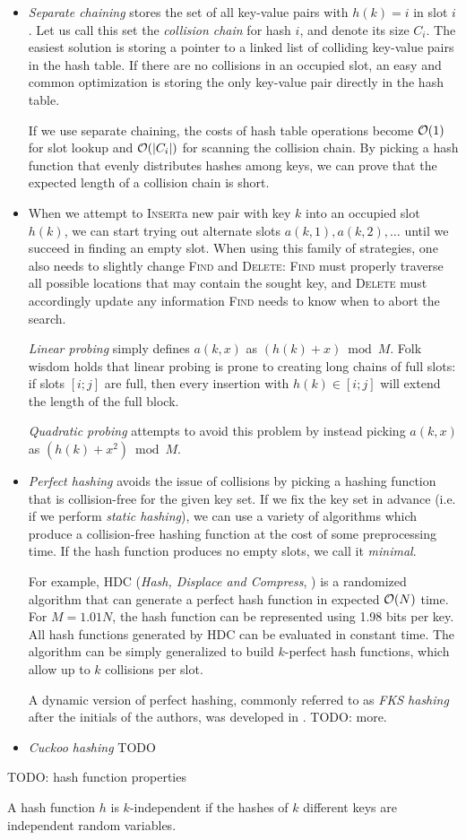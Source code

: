 \begin{itemize}
\item
\emph{Separate chaining} stores the set of all key-value pairs with
$h(k)=i$ in slot $i$. Let us call this set the \emph{collision chain} for hash
$i$, and denote its size $C_i$. The easiest solution is storing a pointer to
a linked list of colliding key-value pairs in the hash table. If there are no
collisions in an occupied slot, an easy and common optimization is storing
the only key-value pair directly in the hash table.

If we use separate chaining, the costs of hash table operations become $\mathcal{O}(1)$
for slot lookup and $\mathcal{O}(|C_i|)$ for scanning the collision chain. By picking
a hash function that evenly distributes hashes among keys, we can prove
that the expected length of a collision chain is short.

\item
When we attempt to \textsc{Insert}a new pair with key $k$ into an occupied slot
$h(k)$, we can start trying out alternate slots $a(k,1), a(k,2), \ldots$
until we succeed in finding an empty slot. When using this family of strategies,
one also needs to slightly change \textsc{Find} and \textsc{Delete}:
\textsc{Find} must properly traverse all possible locations that may contain
the sought key, and \textsc{Delete} must accordingly update any information
\textsc{Find} needs to know when to abort the search.

\emph{Linear probing} simply defines $a(k,x)$ as $(h(k)+x) \bmod M$.
Folk wisdom holds that linear probing is prone to creating long chains
of full slots: if slots $[i;j]$ are full, then every insertion with
$h(k)\in[i;j]$ will extend the length of the full block.

\emph{Quadratic probing} attempts to avoid this problem by instead picking
$a(k,x)$ as $(h(k)+x^2) \bmod M$.

\item
\emph{Perfect hashing} avoids the issue of collisions by picking a hashing
function that is collision-free for the given key set. If we fix the key
set in advance (i.e. if we perform \emph{static hashing}), we can use
a variety of algorithms which produce a collision-free hashing function
at the cost of some preprocessing time. If the hash function produces no
empty slots, we call it \emph{minimal}.

For example, HDC (\textit{Hash, Displace and Compress},
\cite{hdc-hashing}) is a randomized algorithm that can generate a perfect
hash function in expected $\mathcal{O}(N)$ time. For $M=1.01 N$, the hash function can be
represented using 1.98 bits per key. All hash functions generated by HDC can be
evaluated in constant time. The algorithm can be simply generalized to build
$k$-perfect hash functions, which allow up to $k$ collisions per slot.

A dynamic version of perfect hashing, commonly referred to as \emph{FKS
hashing} after the initials of the authors, was developed in \cite{fks-hashing}.
TODO: more.

\item
\emph{Cuckoo hashing}
TODO

\end{itemize}

TODO: hash function properties

A hash function $h$ is $k$-independent if the hashes of $k$ different keys
are independent random variables.
